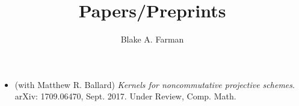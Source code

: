 \documentclass[11pt]{amsart}
\title{Papers/Preprints}
\author{Blake A. Farman}
\date{}
\begin{document}
\maketitle

\begin{itemize}
\item
  (with Matthew R. Ballard) \textit{Kernels for noncommutative projective schemes}.
  arXiv: 1709.06470, Sept. 2017. Under Review, Comp. Math.
\end{itemize}
\end{document}
